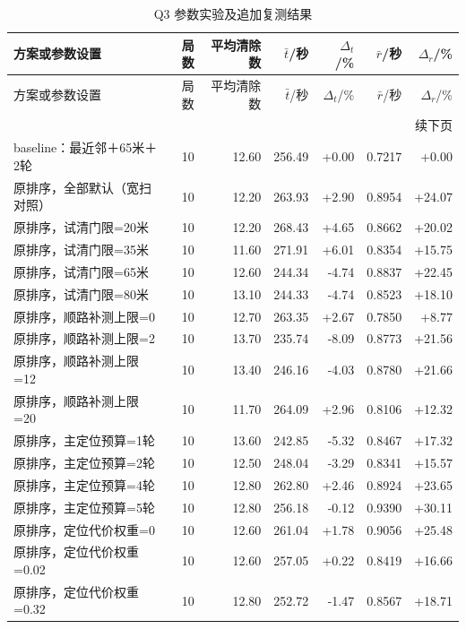 \begingroup\small\setlength{\tabcolsep}{3pt}
\begin{longtable}{p{}rrrrrr}
\caption{Q3 参数实验及追加复测结果}\label{tab:official-q3-3}\\
\toprule
方案或参数设置 & 局数 & 平均清除数 & $\bar t$/秒 & $\Delta_t$/\% & $\bar r$/秒 & $\Delta_r$/\% \\
\midrule\endfirsthead
\toprule
方案或参数设置 & 局数 & 平均清除数 & $\bar t$/秒 & $\Delta_t$/\% & $\bar r$/秒 & $\Delta_r$/\% \\
\midrule\endhead
\midrule\multicolumn{7}{r}{续下页}\\\endfoot
\bottomrule\endlastfoot
baseline：最近邻＋65米＋2轮 & 10 & 12.60 & 256.49 & +0.00 & 0.7217 & +0.00 \\
原排序，全部默认（宽扫对照） & 10 & 12.20 & 263.93 & +2.90 & 0.8954 & +24.07 \\
原排序，试清门限=20米 & 10 & 12.20 & 268.43 & +4.65 & 0.8662 & +20.02 \\
原排序，试清门限=35米 & 10 & 11.60 & 271.91 & +6.01 & 0.8354 & +15.75 \\
原排序，试清门限=65米 & 10 & 12.60 & 244.34 & -4.74 & 0.8837 & +22.45 \\
原排序，试清门限=80米 & 10 & 13.10 & 244.33 & -4.74 & 0.8523 & +18.10 \\
原排序，顺路补测上限=0 & 10 & 12.70 & 263.35 & +2.67 & 0.7850 & +8.77 \\
原排序，顺路补测上限=2 & 10 & 13.70 & 235.74 & -8.09 & 0.8773 & +21.56 \\
原排序，顺路补测上限=12 & 10 & 13.40 & 246.16 & -4.03 & 0.8780 & +21.66 \\
原排序，顺路补测上限=20 & 10 & 11.70 & 264.09 & +2.96 & 0.8106 & +12.32 \\
原排序，主定位预算=1轮 & 10 & 13.60 & 242.85 & -5.32 & 0.8467 & +17.32 \\
原排序，主定位预算=2轮 & 10 & 12.50 & 248.04 & -3.29 & 0.8341 & +15.57 \\
原排序，主定位预算=4轮 & 10 & 12.80 & 262.80 & +2.46 & 0.8924 & +23.65 \\
原排序，主定位预算=5轮 & 10 & 12.80 & 256.18 & -0.12 & 0.9390 & +30.11 \\
原排序，定位代价权重=0 & 10 & 12.60 & 261.04 & +1.78 & 0.9056 & +25.48 \\
原排序，定位代价权重=0.02 & 10 & 12.60 & 257.05 & +0.22 & 0.8419 & +16.66 \\
原排序，定位代价权重=0.32 & 10 & 12.80 & 252.72 & -1.47 & 0.8567 & +18.71 \\

\end{longtable}

